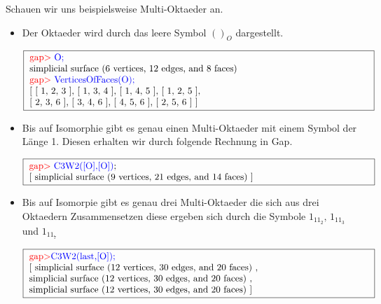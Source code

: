 \documentclass[12pt,titlepage,twoside,cleardoublepage]{article}
\theoremstyle{nummermitklammern}
\numberwithin{equation}{section}
\begin{document}
Schauen wir uns beispielsweise Multi-Oktaeder an.
\begin{itemize}
\item Der Oktaeder wird durch das leere Symbol $()_O$ dargestellt.
\begin{center}
$\fbox{
\parbox{13cm}{
\textcolor{red}{gap$>$} \textcolor{blue}{O;}\newline 
simplicial surface (6 vertices, 12 edges, and 8 faces) \newline
\textcolor{red}{gap$>$} \textcolor{blue}{VerticesOfFaces(O);}\newline
[ [ 1, 2, 3 ], [ 1, 3, 4 ], [ 1, 4, 5 ], [ 1, 2, 5 ], \newline
[ 2, 3, 6 ], [ 3, 4, 6 ], [ 4, 5, 6 ], [ 2, 5, 6 ] ]
}}$
\end{center}

\item Bis auf Isomorphie gibt es genau einen Multi-Oktaeder mit einem Symbol der Länge 1. Diesen erhalten wir durch folgende Rechnung in Gap.
\begin{center}
$\fbox{
\parbox{13cm}{
\textcolor{red}{gap$>$} \textcolor{blue}{C3W2([O],[O])};\newline
[ simplicial surface (9 vertices, 21 edges, and 14 faces) ]
}}$
\end{center}
\item Bis auf Isomorpie gibt es genau drei Multi-Oktaeder die sich aus drei Oktaedern Zusammensetzen diese ergeben sich durch die Symbole $1_11_2,\, 1_11_3$ und $1_11_7$

\begin{center}
$\fbox{
\parbox{13cm}{
\textcolor{red}{gap$>$}\textcolor{blue}{ C3W2(last,[O]);}\newline
[ simplicial surface (12 vertices, 30 edges, and 20 faces)
    ,\newline
     simplicial surface (12 vertices, 30 edges, and 20 faces)
    ,\newline
  simplicial surface (12 vertices, 30 edges, and 20 faces)
 ]
}}$
\end{center}
\end{itemize}
\end{document}

